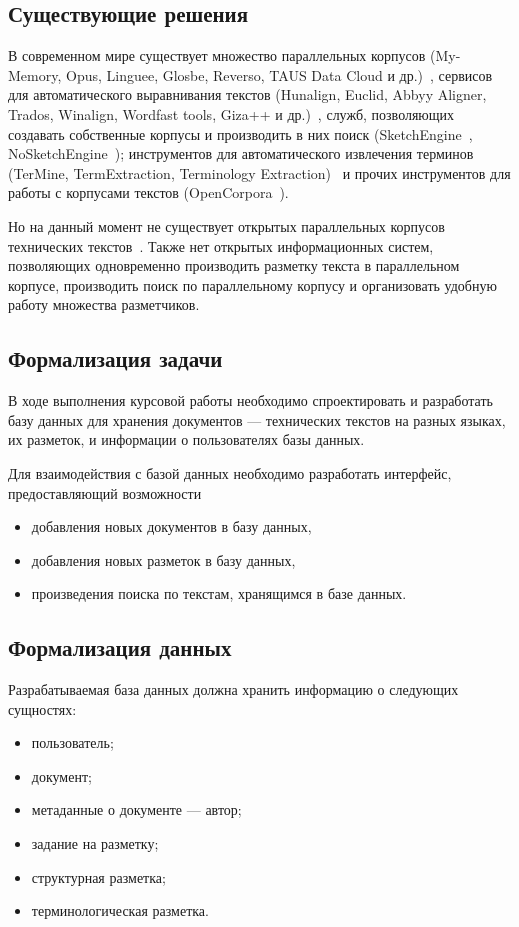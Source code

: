 \subsection{Существующие решения}

В современном мире существует множество параллельных корпусов (My-Memory, Opus, Linguee, Glosbe, Reverso, TAUS Data Cloud и др.)~\cite{butenko2020-1}, сервисов для автоматического выравнивания текстов (Hunalign, Euclid, Abbyy Aligner, Trados, Winalign, Wordfast tools, Giza++ и др.)~\cite[с. 62]{cl2020}, служб, позволяющих создавать собственные корпусы и производить в них поиск (SketchEngine~\cite{ske}, NoSketchEngine~\cite{noske}); инструментов для автоматического извлечения терминов (TerMine, TermExtraction, Terminology Extraction)~\cite{butenko2022} и прочих инструментов для работы с корпусами текстов (OpenCorpora~\cite{opencorpora}).

Но на данный момент не существует открытых параллельных корпусов технических текстов~\cite{butenko2020-2}.
Также нет открытых информационных систем, позволяющих одновременно производить разметку текста в параллельном корпусе, производить поиск по параллельному корпусу и организовать удобную работу множества разметчиков.

\subsection{Формализация задачи}

В ходе выполнения курсовой работы необходимо спроектировать и разработать базу данных для хранения документов --- технических текстов на разных языках, их разметок, и информации о пользователях базы данных.

Для взаимодействия с базой данных необходимо разработать интерфейс, предоставляющий возможности
\begin{itemize}
    \item добавления новых документов в базу данных,
    \item добавления новых разметок в базу данных,
    \item произведения поиска по текстам, хранящимся в базе данных.
\end{itemize}

\subsection{Формализация данных}

Разрабатываемая база данных должна хранить информацию о следующих сущностях:
\begin{itemize}
    \item пользователь;
    \item документ;
    \item метаданные о документе --- автор;
    \item задание на разметку;
    \item структурная разметка;
    \item терминологическая разметка.
\end{itemize}

